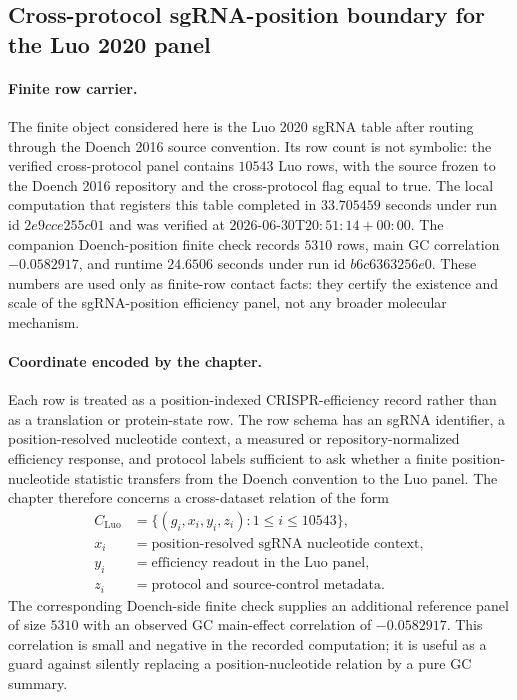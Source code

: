 
\subsection{Cross-protocol sgRNA-position boundary for the Luo 2020 panel}
\label{sec:bioreality-crispr-sgrna-position-luo2020}

\paragraph{Finite row carrier.}
The finite object considered here is the Luo 2020 sgRNA table after routing through the Doench 2016 source convention.  Its row count is not symbolic: the verified cross-protocol panel contains $10543$ Luo rows, with the source frozen to the Doench 2016 repository and the cross-protocol flag equal to true.  The local computation that registers this table completed in $33.705459$ seconds under run id $2e9cce255c01$ and was verified at $2026$-$06$-$30$T$20{:}51{:}14+00{:}00$.  The companion Doench-position finite check records $5310$ rows, main GC correlation $-0.0582917$, and runtime $24.6506$ seconds under run id $b6c6363256e0$.  These numbers are used only as finite-row contact facts: they certify the existence and scale of the sgRNA-position efficiency panel, not any broader molecular mechanism.

\paragraph{Coordinate encoded by the chapter.}
Each row is treated as a position-indexed CRISPR-efficiency record rather than as a translation or protein-state row.  The row schema has an sgRNA identifier, a position-resolved nucleotide context, a measured or repository-normalized efficiency response, and protocol labels sufficient to ask whether a finite position-nucleotide statistic transfers from the Doench convention to the Luo panel.  The chapter therefore concerns a cross-dataset relation of the form
$$
\begin{aligned}
  C_{\mathrm{Luo}} &= \{(g_i, x_i, y_i, z_i) : 1 \leq i \leq 10543\},\\
  x_i &= \text{position-resolved sgRNA nucleotide context},\\
  y_i &= \text{efficiency readout in the Luo panel},\\
  z_i &= \text{protocol and source-control metadata}.
\end{aligned}
$$
The corresponding Doench-side finite check supplies an additional reference panel of size $5310$ with an observed GC main-effect correlation of $-0.0582917$.  This correlation is small and negative in the recorded computation; it is useful as a guard against silently replacing a position-nucleotide relation by a pure GC summary.

